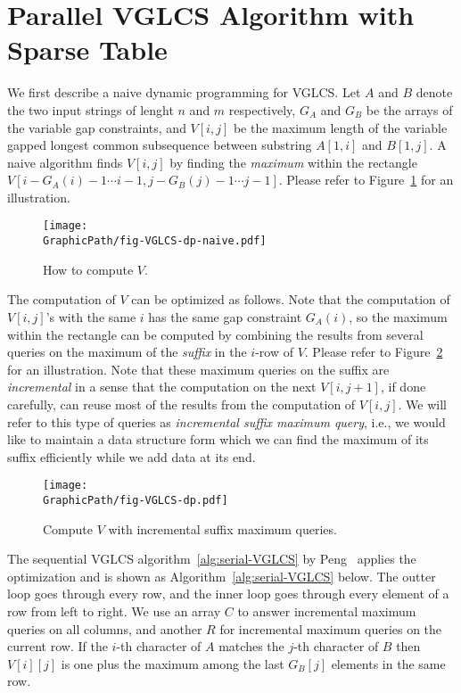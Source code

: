 \section{Parallel VGLCS Algorithm with Sparse Table} %
\label{sec:parallelVGLCS}


We first describe a naive dynamic programming for VGLCS.  Let $A$ and
$B$ denote the two input strings of lenght $n$ and $m$ respectively,
$G_A$ and $G_B$ be the arrays of the variable gap constraints, and
$V[i, j]$ be the maximum length of the variable gapped longest common
subsequence between substring $A[1, i]$ and $B[1, j]$.  A naive
algorithm finds $V[i, j]$ by finding the {\em maximum} within the
rectangle $V[i-G_A(i)-1 \cdots i-1, j-G_B(j)-1 \cdots j-1]$.  Please
refer to Figure~\ref{fig:fig-VGLCS-dp-naive} for an illustration.



\begin{figure}[!thb]
  \texttt{[image: \\GraphicPath/fig-VGLCS-dp-naive.pdf]}
  \caption{How to compute $V$.}
  \label{fig:fig-VGLCS-dp-naive}
\end{figure}

The computation of $V$ can be optimized as follows.  Note that the
computation of $V[i, j]$'s with the same $i$ has the same gap
constraint $G_A(i)$, so the maximum within the rectangle can be
computed by combining the results from several queries on the maximum
of the {\em suffix} in the $i$-row of $V$.  Please refer to
Figure~\ref{fig:fig-VGLCS-dp} for an illustration.  Note that these
maximum queries on the suffix are {\em incremental} in a sense that
the computation on the next $V[i, j + 1]$, if done carefully, can
reuse most of the results from the computation of $V[i, j]$.  We will
refer to this type of queries as {\em incremental suffix maximum
  query}, i.e., we would like to maintain a data structure form which
we can find the maximum of its suffix efficiently while we add data at
its end.

\begin{figure}[!thb]
  \texttt{[image: \\GraphicPath/fig-VGLCS-dp.pdf]}
  \caption{Compute $V$ with incremental suffix maximum queries.}
  \label{fig:fig-VGLCS-dp}
\end{figure}

The sequential VGLCS algorithm~\ref{alg:serial-VGLCS} by
Peng~\cite{Peng2011TheLC} applies the optimization and is shown as
Algorithm~\ref{alg:serial-VGLCS} below.  The outter loop goes through
every row, and the inner loop goes through every element of a row from
left to right.  We use an array $C$ to answer incremental maximum
queries on all columns, and another $R$ for incremental maximum
queries on the current row.  If the $i$-th character of $A$ matches
the $j$-th character of $B$ then $V[i][j]$ is one plus the maximum
among the last $G_B[j]$ elements in the same row.
 

